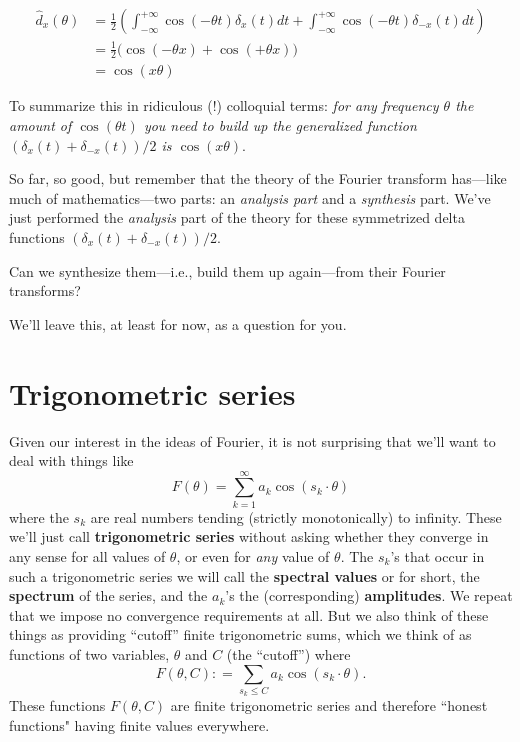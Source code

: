 \documentclass[openany]{book}
\theoremstyle{plain}
\theoremstyle{definition}
\begin{document}
{{\begin{align*}\label{dx}
{\hat d_x}(\theta)  &=  {\frac{1}{2}}\left(\int_{-\infty}^{+\infty}\cos(-\theta t)\delta_x(t)dt + \int_{-\infty}^{+\infty}\cos(-\theta t)\delta_{-x}(t)dt\right)\\
    &= {\frac{1}{2}}\big(\cos(-\theta x)+ \cos(+\theta x)\big)\\
    &= \cos(x\theta)
\end{align*}


To summarize this in ridiculous (!) colloquial terms: {\it for any
  frequency $\theta$ the amount of $\cos(\theta t)$ you need to build
  up the generalized function $(\delta_x(t) + \delta_{-x}(t))/2$ is
  $\cos(x\theta).$ }


So far, so good, but remember that the theory of the Fourier transform
has---like much of mathematics---two parts: an {\it analysis part} and
a {\it synthesis} part.  We've just performed the {\it analysis} part
of the theory for these symmetrized delta functions $(\delta_x(t) +
\delta_{-x}(t))/2$.

Can we synthesize them---i.e., build them up again---from their Fourier transforms?


  We'll leave this, at least for now, as a question for you.




\chapter{Trigonometric series}\label{ch:trigseries}
Given our interest in the ideas of Fourier, it is not surprising that
we'll want to deal with things like $$F(\theta) = \sum_{k=1}^{\infty}
a_k\cos(s_k\cdot \theta)$$ where the $s_k$ are real numbers tending
(strictly monotonically) to infinity.  These we'll just call {\bf
  trigonometric series} without asking whether they converge in any
sense for all values of $\theta$, or even for {\it any} value of $\theta$. The
$s_k$'s that occur in such a trigonometric series we will call the
{\bf spectral values} or for short, the {\bf spectrum} of the series,
and the $a_k$'s the (corresponding) {\bf amplitudes}.  We repeat that
we impose no convergence requirements at all. But we also think of
these things as providing ``cutoff'' finite trigonometric sums, which
we think of as functions of two variables, $\theta$ and $C$ (the
``cutoff'') where $$F(\theta,C): = \sum_{s_k\le C} a_k\cos(s_k\cdot \theta).$$ These functions $F(\theta,C)$ are finite trigonometric series and therefore ``honest functions" having finite values everywhere.


}}
\end{document}
